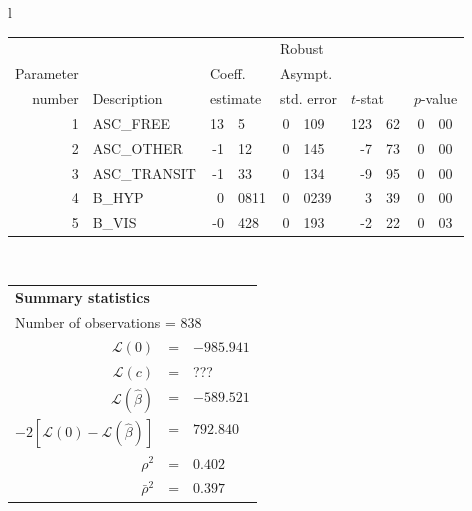   \begin{tabular}{l}
\begin{tabular}{rlr@{.}lr@{.}lr@{.}lr@{.}l}
         &                       &   \multicolumn{2}{l}{}    & \multicolumn{2}{l}{Robust}  &     \multicolumn{4}{l}{}   \\
Parameter &                       &   \multicolumn{2}{l}{Coeff.}      & \multicolumn{2}{l}{Asympt.}  &     \multicolumn{4}{l}{}   \\
number &  Description                     &   \multicolumn{2}{l}{estimate}      & \multicolumn{2}{l}{std. error}  &   \multicolumn{2}{l}{$t$-stat}  &   \multicolumn{2}{l}{$p$-value}   \\

\hline

1 & ASC\_FREE & 13&5 & 0&109 & 123&62 & 0&00 \\
2 & ASC\_OTHER & -1&12 & 0&145 & -7&73 & 0&00 \\
3 & ASC\_TRANSIT & -1&33 & 0&134 & -9&95 & 0&00 \\
4 & B\_HYP & 0&0811 & 0&0239 & 3&39 & 0&00 \\
5 & B\_VIS & -0&428 & 0&193 & -2&22 & 0&03 \\
\hline

\end{tabular}
\\
\begin{tabular}{rcl}
\multicolumn{3}{l}{\bf Summary statistics}\\
\multicolumn{3}{l}{ Number of observations = $838$} \\
 $\mathcal{L}(0)$ &=&  $-985.941$ \\
 $\mathcal{L}(c)$ &=& ???\\
 $\mathcal{L}(\hat{\beta})$ &=& $-589.521 $  \\
 $-2[\mathcal{L}(0) -\mathcal{L}(\hat{\beta})]$ &=& $792.840$ \\
    $\rho^2$ &=&   $0.402$ \\
    $\bar{\rho}^2$ &=&    $0.397$ \\
\end{tabular}
\end{tabular}


